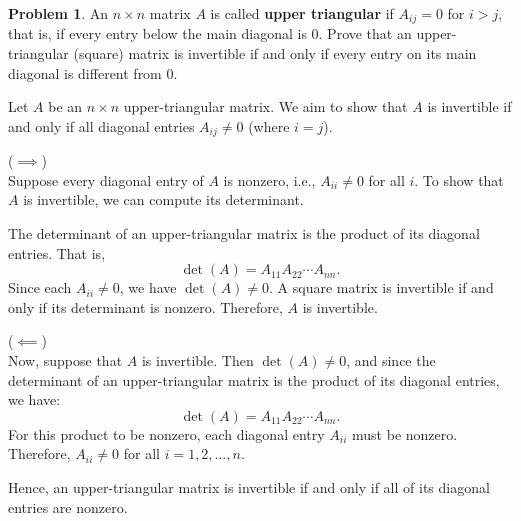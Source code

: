 \documentclass[12pt]{article}
\theoremstyle{definition}
\newtheorem{problem}{Problem}
\begin{document}
\begin{problem}
    An $n \times n$ matrix $A$ is called \textbf{upper triangular} if $A_{ij} = 0$ for $i > j$, that is, if every entry below the main diagonal is $0$.
    Prove that an upper-triangular (square) matrix is invertible if and only if every entry on its main diagonal is different from $0$.
    
    \begin{solution}
        Let $A$ be an $n \times n$ upper-triangular matrix. We aim to show that $A$ is invertible if and only if all diagonal entries $A_{ij} \neq 0$ (where $i=j$).

        ($\implies$)\\
        Suppose every diagonal entry of \( A \) is nonzero, i.e., \( A_{ii} \neq 0 \) for all \( i \). To show that \( A \) is invertible, we can compute its determinant.

        The determinant of an upper-triangular matrix is the product of its diagonal entries. That is,
        \[    \det(A) = A_{11} A_{22} \cdots A_{nn}.    \]
        Since each \( A_{ii} \neq 0 \), we have \( \det(A) \neq 0 \). A square matrix is invertible if and only if its determinant is nonzero. Therefore, \( A \) is invertible.

        ($\impliedby$)\\
        Now, suppose that \( A \) is invertible. Then \( \det(A) \neq 0 \), and since the determinant of an upper-triangular matrix is the product of its diagonal entries, we have:
        \[
        \det(A) = A_{11} A_{22} \cdots A_{nn}.
        \]
        For this product to be nonzero, each diagonal entry \( A_{ii} \) must be nonzero. Therefore, \( A_{ii} \neq 0 \) for all \( i = 1, 2, \dots, n \).

        Hence, an upper-triangular matrix is invertible if and only if all of its diagonal entries are nonzero.
    \end{solution}
\end{problem}
\end{document}
